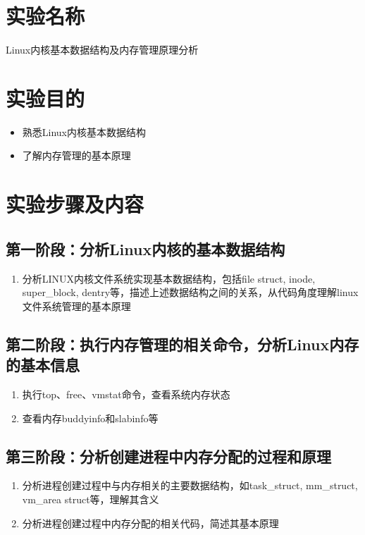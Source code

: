 \documentclass{whureport}
\title{\homeworkname}
\date{}
\begin{document}
\makecover

\section{实验名称}
Linux内核基本数据结构及内存管理原理分析




\section{实验目的}
\begin{itemize}
	\item 熟悉Linux内核基本数据结构
	\item 了解内存管理的基本原理
\end{itemize}




\section{实验步骤及内容}
\subsection{第一阶段：分析Linux内核的基本数据结构}
\begin{enumerate}
	\item 分析LINUX内核文件系统实现基本数据结构，包括file struct, inode, super\_block, dentry等，描述上述数据结构之间的关系，从代码角度理解linux文件系统管理的基本原理
\end{enumerate}





\subsection{第二阶段：执行内存管理的相关命令，分析Linux内存的基本信息}
\begin{enumerate}
	\item 执行top、free、vmstat命令，查看系统内存状态
	\item 查看内存buddyinfo和slabinfo等
\end{enumerate}





\subsection{第三阶段：分析创建进程中内存分配的过程和原理}
\begin{enumerate}
	\item 分析进程创建过程中与内存相关的主要数据结构，如task\_struct, mm\_struct, vm\_area struct等，理解其含义
	\item 分析进程创建过程中内存分配的相关代码，简述其基本原理
\end{enumerate}
\end{document}
